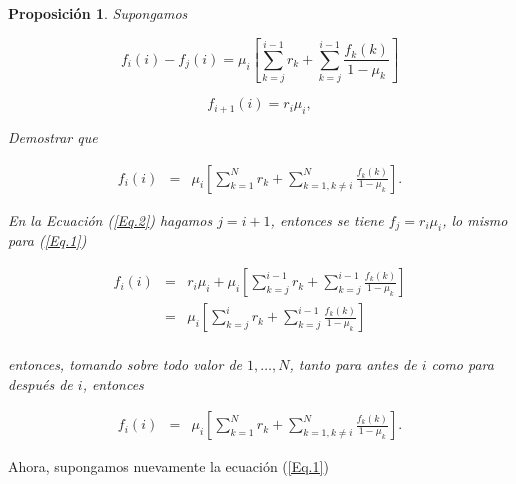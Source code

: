 \documentclass{article}
\newtheorem{Prop}{Proposición}[section]
\numberwithin{equation}{section}
\begin{document}
\begin{Prop}
Supongamos

\begin{equation}\label{Eq.1}
f_{i}\left(i\right)-f_{j}\left(i\right)=\mu_{i}\left[\sum_{k=j}^{i-1}r_{k}+\sum_{k=j}^{i-1}\frac{f_{k}\left(k\right)}{1-\mu_{k}}\right]
\end{equation}

\begin{equation}\label{Eq.2}
f_{i+1}\left(i\right)=r_{i}\mu_{i},
\end{equation}

Demostrar que

\begin{eqnarray*}
f_{i}\left(i\right)&=&\mu_{i}\left[\sum_{k=1}^{N}r_{k}+\sum_{k=1,k\neq i}^{N}\frac{f_{k}\left(k\right)}{1-\mu_{k}}\right].
\end{eqnarray*}

En la Ecuaci\'on (\ref{Eq.2}) hagamos $j=i+1$, entonces se tiene $f_{j}=r_{i}\mu_{i}$, lo mismo para (\ref{Eq.1})

\begin{eqnarray*}
f_{i}\left(i\right)&=&r_{i}\mu_{i}+\mu_{i}\left[\sum_{k=j}^{i-1}r_{k}+\sum_{k=j}^{i-1}\frac{f_{k}\left(k\right)}{1-\mu_{k}}\right]\\
&=&\mu_{i}\left[\sum_{k=j}^{i}r_{k}+\sum_{k=j}^{i-1}\frac{f_{k}\left(k\right)}{1-\mu_{k}}\right]\\
\end{eqnarray*}

entonces, tomando sobre todo valor de $1,\ldots,N$, tanto para antes de $i$ como para despu\'es de $i$, entonces

\begin{eqnarray*}
f_{i}\left(i\right)&=&\mu_{i}\left[\sum_{k=1}^{N}r_{k}+\sum_{k=1,k\neq i}^{N}\frac{f_{k}\left(k\right)}{1-\mu_{k}}\right].
\end{eqnarray*}
\end{Prop}

Ahora, supongamos nuevamente la ecuaci\'on (\ref{Eq.1})
\end{document}
